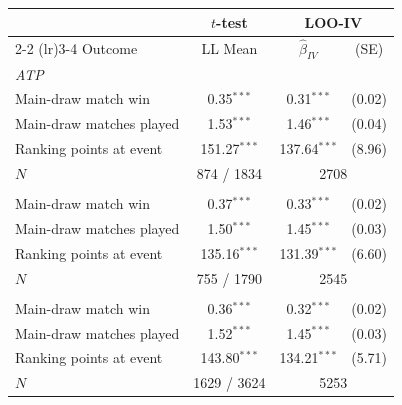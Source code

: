 \begin{tabular}{l ccc}
\toprule
 & $t$-test & \multicolumn{2}{c}{LOO-IV} \\
\cmidrule(lr){2-2} \cmidrule(lr){3-4}
Outcome & LL Mean & $\hat{\beta}_{IV}$ & (SE) \\
\midrule
\multicolumn{4}{l}{\textit{ATP}} \\
\quad Main-draw match win & 0.35$^{***}$ & 0.31$^{***}$ & (0.02) \\
\quad Main-draw matches played & 1.53$^{***}$ & 1.46$^{***}$ & (0.04) \\
\quad Ranking points at event & 151.27$^{***}$ & 137.64$^{***}$ & (8.96) \\
\quad $N$ & \multicolumn{1}{c}{874 / 1834} & \multicolumn{2}{c}{2708} \\
\addlinespace
\multicolumn{4}{l}{\textit{WTA}} \\
\quad Main-draw match win & 0.37$^{***}$ & 0.33$^{***}$ & (0.02) \\
\quad Main-draw matches played & 1.50$^{***}$ & 1.45$^{***}$ & (0.03) \\
\quad Ranking points at event & 135.16$^{***}$ & 131.39$^{***}$ & (6.60) \\
\quad $N$ & \multicolumn{1}{c}{755 / 1790} & \multicolumn{2}{c}{2545} \\
\addlinespace
\multicolumn{4}{l}{\textit{Pooled}} \\
\quad Main-draw match win & 0.36$^{***}$ & 0.32$^{***}$ & (0.02) \\
\quad Main-draw matches played & 1.52$^{***}$ & 1.45$^{***}$ & (0.03) \\
\quad Ranking points at event & 143.80$^{***}$ & 134.21$^{***}$ & (5.71) \\
\quad $N$ & \multicolumn{1}{c}{1629 / 3624} & \multicolumn{2}{c}{5253} \\
\bottomrule
\end{tabular}
